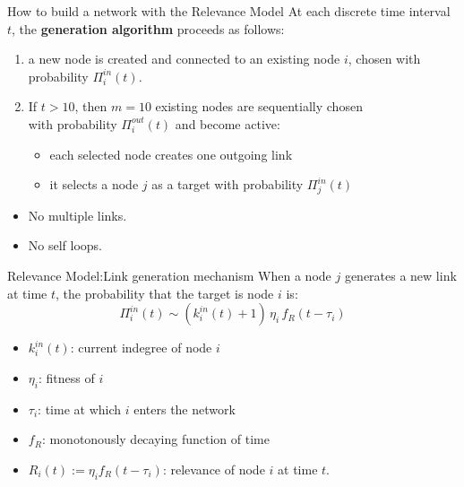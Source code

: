 \begin{frame}{How to build a network with the Relevance Model}
    At each discrete time interval $t$, the \textbf{generation algorithm} proceeds as follows:
    \begin{enumerate}
        \item a \alert{new node} is created and connected to an existing node $i$, chosen with probability $\Pi_i^{in}(t)$.
        \item If $t>10$, then $m=10$ existing nodes are sequentially chosen \\ with probability $\Pi_i^{out}(t)$ and become \alert{active}:
        \begin{itemize}
            \item each selected node creates one outgoing link
            \item it selects a node $j$ as a target with probability $\Pi_j^{in}(t)$
        \end{itemize}
    \end{enumerate}
    \vspace{1em}
    \begin{footnotesize}
    \begin{itemize}
        \item No multiple links.
        \item No self loops.
    \end{itemize}
    \end{footnotesize}
\end{frame}

\begin{frame}{Relevance Model:\@ Link generation mechanism}
    When a node $j$ generates a new link at time $t$, the probability that the target is node $i$ is:
    \[
        \Pi_i^{in}(t) \sim (k_i^{in}(t) + 1) \, \eta_i \, f_R (t-\tau_i)
    \]
    \begin{itemize}
        \item $k_i^{in}(t)$: current indegree of node $i$
        \item $\eta_i$: fitness of $i$
        \item $\tau_i$: time at which $i$ enters the network
        \item $f_R$: monotonously decaying function of time
        \item $R_i(t) := \eta_i f_R (t-\tau_i)$: \alert{relevance} of node $i$ at time $t$.
    \end{itemize}
\end{frame}

